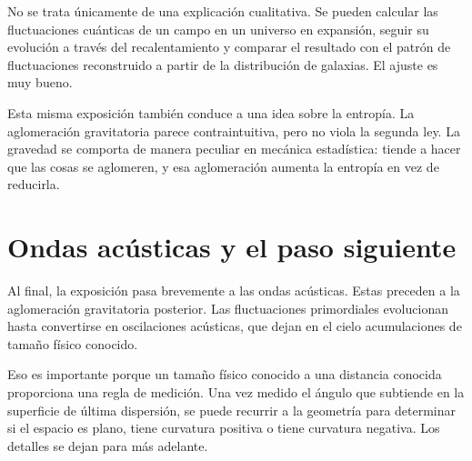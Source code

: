 No se trata únicamente de una explicación cualitativa. Se pueden calcular las fluctuaciones cuánticas de un campo en un universo en expansión, seguir su evolución a través del recalentamiento y comparar el resultado con el patrón de fluctuaciones reconstruido a partir de la distribución de galaxias. El ajuste es muy bueno.

Esta misma exposición también conduce a una idea sobre la entropía. La aglomeración gravitatoria parece contraintuitiva, pero no viola la segunda ley. La gravedad se comporta de manera peculiar en mecánica estadística: tiende a hacer que las cosas se aglomeren, y esa aglomeración aumenta la entropía en vez de reducirla.

\begin{classroomqa}
\end{classroomqa}

\section{Ondas acústicas y el paso siguiente}

Al final, la exposición pasa brevemente a las ondas acústicas. Estas preceden a la aglomeración gravitatoria posterior. Las fluctuaciones primordiales evolucionan hasta convertirse en oscilaciones acústicas, que dejan en el cielo acumulaciones de tamaño físico conocido.

Eso es importante porque un tamaño físico conocido a una distancia conocida proporciona una regla de medición. Una vez medido el ángulo que subtiende en la superficie de última dispersión, se puede recurrir a la geometría para determinar si el espacio es plano, tiene curvatura positiva o tiene curvatura negativa. Los detalles se dejan para más adelante.

\begin{classroomqa}
\end{classroomqa}